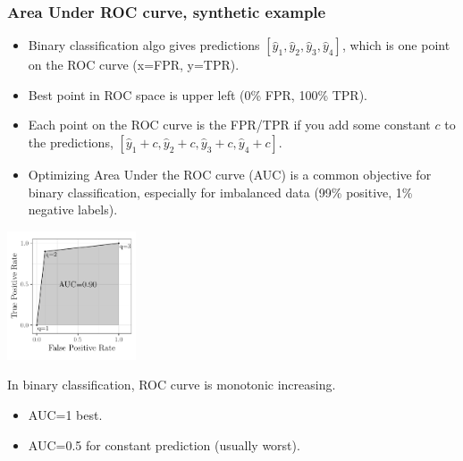 \documentclass{beamer}
\begin{document}
\begin{frame}
  \frametitle{Area Under ROC curve, synthetic example}

  \begin{itemize}
  \item Binary classification algo gives predictions
    $[\hat y_1,\hat y_2,\hat y_3,\hat y_4]$, which is one point on the
    ROC curve (x=FPR, y=TPR).
  \item Best point in ROC space is upper left (0\% FPR, 100\% TPR).
  \item Each point on the ROC curve is the FPR/TPR if you add some
  constant $c$ to the predictions,
  $[\hat y_1+c,\hat y_2+c,\hat y_3+c,\hat y_4+c]$.
  \item Optimizing Area Under the ROC curve (AUC) is a common
    objective for binary classification, especially for imbalanced
    data (99\% positive, 1\% negative labels).
  \end{itemize}
  
  \parbox{1.5in}{
\includegraphics[width=1.5in]{figure-more-than-one-less-auc}
}
\parbox{2.5in}{
In binary classification, ROC curve is monotonic increasing.
  \begin{itemize}
  \item AUC=1 best.
  \item AUC=0.5 for constant prediction (usually worst).
  \end{itemize}
}

\end{frame}
\end{document}
